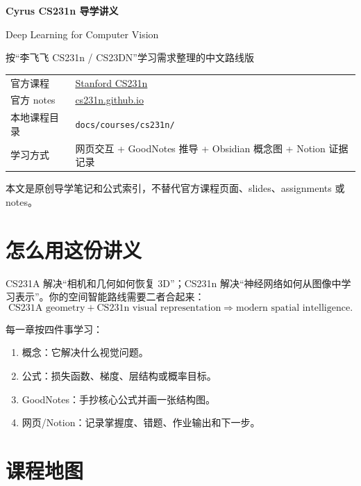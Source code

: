 \documentclass[11pt]{article}
\begin{document}
\begin{titlepage}
  \centering
  {\sffamily\bfseries\Huge Cyrus CS231n 导学讲义\par}
  \vspace{0.8em}
  {\Large Deep Learning for Computer Vision\par}
  \vspace{1.2em}
  {\large 按“李飞飞 CS231n / CS23DN”学习需求整理的中文路线版\par}
  \vfill
  \begin{tabular}{ll}
    官方课程 & \href{https://cs231n.stanford.edu/}{Stanford CS231n} \\
    官方 notes & \href{https://cs231n.github.io/}{cs231n.github.io} \\
    本地课程目录 & \texttt{docs/courses/cs231n/} \\
    学习方式 & 网页交互 + GoodNotes 推导 + Obsidian 概念图 + Notion 证据记录 \\
  \end{tabular}
  \vfill
  {\small 本文是原创导学笔记和公式索引，不替代官方课程页面、slides、assignments 或 notes。}
\end{titlepage}

\tableofcontents
\newpage

\section*{怎么用这份讲义}

CS231A 解决“相机和几何如何恢复 3D”；CS231n 解决“神经网络如何从图像中学习表示”。你的空间智能路线需要二者合起来：
\[
  \text{CS231A geometry} + \text{CS231n visual representation}
  \Rightarrow
  \text{modern spatial intelligence}.
\]

每一章按四件事学习：
\begin{enumerate}
  \item 概念：它解决什么视觉问题。
  \item 公式：损失函数、梯度、层结构或概率目标。
  \item GoodNotes：手抄核心公式并画一张结构图。
  \item 网页/Notion：记录掌握度、错题、作业输出和下一步。
\end{enumerate}

\section{课程地图}
\end{document}
